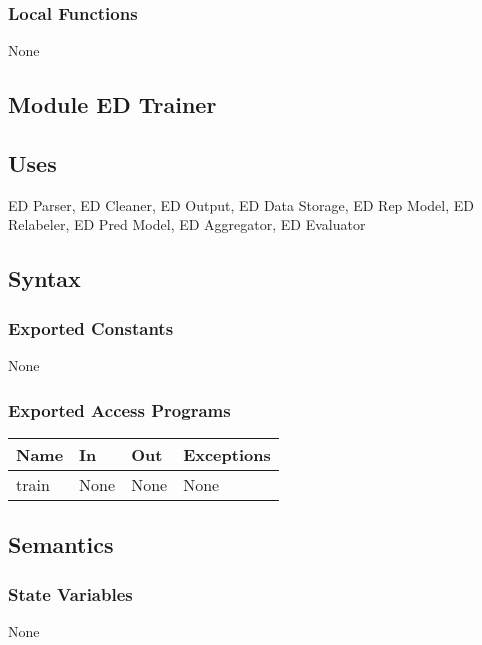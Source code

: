 \documentclass[12pt, titlepage]{article}
\begin{document}
\subsubsection{Local Functions}

None


\subsection{Module ED Trainer}

\subsection{Uses}

ED Parser, ED Cleaner, ED Output, ED Data Storage, ED Rep Model, ED Relabeler, ED Pred Model, ED Aggregator, ED Evaluator

\subsection{Syntax}

\subsubsection{Exported Constants}

None

\subsubsection{Exported Access Programs}

\begin{center}
\begin{tabular}{p{3cm} p{5cm} p{3cm} p{3cm}}
\hline
\textbf{Name} & \textbf{In} & \textbf{Out} & \textbf{Exceptions} \\
\hline
train & None & None & None \\
\hline
\end{tabular}
\end{center}

\subsection{Semantics}

\subsubsection{State Variables}

None
\end{document}
